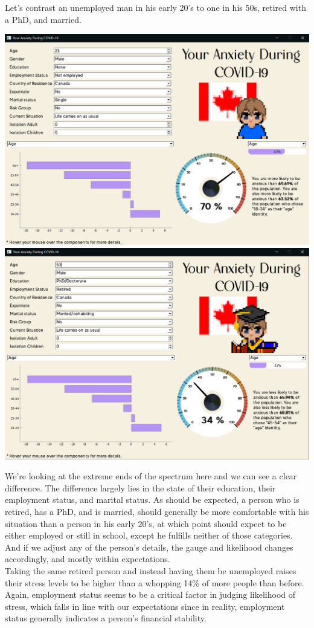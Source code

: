 \documentclass[fontsize=11pt]{article}
\begin{document}
    Let’s contrast an unemployed man in his early 20’s to one in his 50s, retired with a PhD, and married.
    \begin{center}
        \includegraphics[scale=0.30]{img/casestudy_screenshot_1}
        \includegraphics[scale=0.30]{img/casestudy_screenshot_2}
    \end{center}

    We’re looking at the extreme ends of the spectrum here and we can see a clear difference. The difference largely lies in the state of their education, their employment status, and marital status. As should be expected, a person who is retired, has a PhD, and is married, should generally be more comfortable with his situation than a person in his early 20’s, at which point should expect to be either employed or still in school, except he fulfills neither of those categories. And if we adjust any of the person’s details, the gauge and likelihood changes accordingly, and mostly within expectations. \\
    Taking the same retired person and instead having them be unemployed raises their stress levels to be higher than a whopping 14\% of more people than before. Again, employment status seems to be a critical factor in judging likelihood of stress, which falls in line with our expectations since in reality, employment status generally indicates a person’s financial stability.
\end{document}
